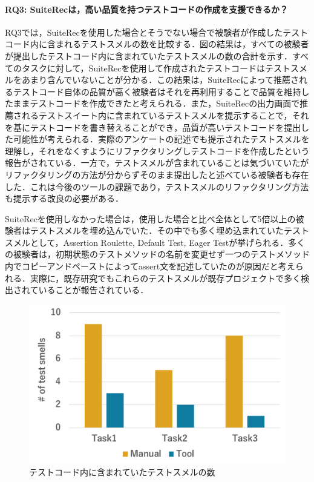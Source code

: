 \documentclass[12pt]{jarticle} %
\begin{document}
\paragraph{RQ3: {\sf SuiteRec}は，高い品質を持つテストコードの作成を支援できるか？}RQ3では，{\sf SuiteRec}を使用した場合とそうでない場合で被験者が作成したテストコード内に含まれるテストスメルの数を比較する．図の結果は，すべての被験者が提出したテストコード内に含まれていたテストスメルの数の合計を示す．すべてのタスクに対して，{\sf SuiteRec}を使用して作成されたテストコードはテストスメルをあまり含んでいないことが分かる．この結果は，{\sf SuiteRec}によって推薦されるテストコード自体の品質が高く被験者はそれを再利用することで品質を維持したままテストコードを作成できたと考えられる．また，{\sf SuiteRec}の出力画面で推薦されるテストスイート内に含まれているテストスメルを提示することで，それを基にテストコードを書き替えることができ，品質が高いテストコードを提出した可能性が考えられる．実際のアンケートの記述でも提示されたテストスメルを理解し，それをなくすようにリファクタリングしテストコードを作成したという報告がされている．一方で，テストスメルが含まれていることは気づいていたがリファクタリングの方法が分からずそのまま提出したと述べている被験者も存在した．これは今後のツールの課題であり，テストスメルのリファクタリング方法も提示する改良の必要がある．

{\sf SuiteRec}を使用しなかった場合は，使用した場合と比べ全体として5倍以上の被験者はテストスメルを埋め込んでいた．その中でも多く埋め込まれていたテストスメルとして，Assertion Roulette, Default Test, Eager Testが挙げられる．多くの被験者は，初期状態のテストメソッドの名前を変更せず一つのテストメソッド内でコピーアンドペーストによってassert文を記述していたのが原因だと考えられる．実際に，既存研究でもこれらのテストスメルが既存プロジェクトで多く検出されていることが報告されている\cite{b9}．

\begin{figure}[htbp]
  \begin{center}
   \includegraphics[width=12cm]{smells.pdf}
  \caption{テストコード内に含まれていたテストスメルの数}
  \label{smell}
  \end{center}
\end{figure}
\end{document}
